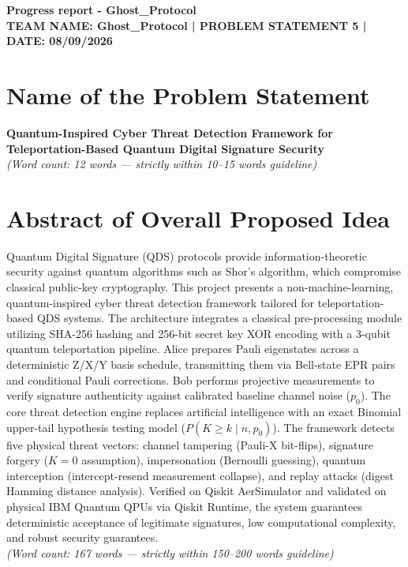 \documentclass[11pt,a4paper]{article}
\begin{document}
\begin{center}
    {\LARGE \bfseries \color{navyblue} Progress report - Ghost\_Protocol} \\[6pt]
    {\large \bfseries \color{accentblue} TEAM NAME: Ghost\_Protocol \quad | \quad PROBLEM STATEMENT 5 \quad | \quad DATE: 08/09/2026} \\[8pt]
\end{center}

\vspace{-10pt}

\section{Name of the Problem Statement}
\textbf{Quantum-Inspired Cyber Threat Detection Framework for Teleportation-Based Quantum Digital Signature Security} \\
\textit{(Word count: 12 words --- strictly within 10--15 words guideline)}

\section{Abstract of Overall Proposed Idea}
Quantum Digital Signature (QDS) protocols provide information-theoretic security against quantum algorithms such as Shor's algorithm, which compromise classical public-key cryptography. This project presents a non-machine-learning, quantum-inspired cyber threat detection framework tailored for teleportation-based QDS systems. The architecture integrates a classical pre-processing module utilizing SHA-256 hashing and 256-bit secret key XOR encoding with a 3-qubit quantum teleportation pipeline. Alice prepares Pauli eigenstates across a deterministic Z/X/Y basis schedule, transmitting them via Bell-state EPR pairs and conditional Pauli corrections. Bob performs projective measurements to verify signature authenticity against calibrated baseline channel noise ($p_0$). The core threat detection engine replaces artificial intelligence with an exact Binomial upper-tail hypothesis testing model ($P(K \ge k \mid n, p_0)$). The framework detects five physical threat vectors: channel tampering (Pauli-X bit-flips), signature forgery ($K=0$ assumption), impersonation (Bernoulli guessing), quantum interception (intercept-resend measurement collapse), and replay attacks (digest Hamming distance analysis). Verified on Qiskit AerSimulator and validated on physical IBM Quantum QPUs via Qiskit Runtime, the system guarantees deterministic acceptance of legitimate signatures, low computational complexity, and robust security guarantees. \\
\textit{(Word count: 167 words --- strictly within 150--200 words guideline)}
\end{document}
